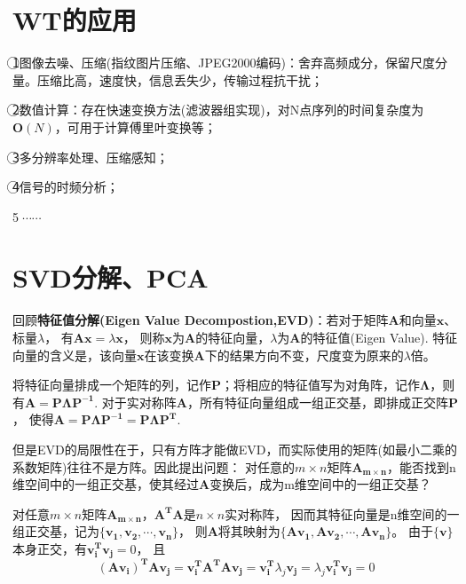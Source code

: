 \documentclass{article}
\begin{document}
\begin{CJK}{UTF8}{gbsn}
\section{WT的应用}
	\textcircled{1}图像去噪、压缩(指纹图片压缩、JPEG2000编码)：舍弃高频成分，保留尺度分量。压缩比高，速度快，信息丢失少，传输过程抗干扰；\par
	\textcircled{2}数值计算：存在快速变换方法(滤波器组实现)，对N点序列的时间复杂度为$\boldsymbol{O}(N)$，可用于计算傅里叶变换等；\par
	\textcircled{3}多分辨率处理、压缩感知；\par
	\textcircled{4}信号的时频分析；\par
	\textcircled{5}$\cdots\cdots$\\

\section{SVD分解、PCA}
	回顾\textbf{特征值分解(Eigen Value Decompostion,EVD)}：若对于矩阵$\boldsymbol{A}$和向量$\boldsymbol{x}$、标量$\lambda$，
	有$\boldsymbol{A}\boldsymbol{x}=\lambda\boldsymbol{x}$，
	则称$\boldsymbol{x}$为$\boldsymbol{A}$的特征向量，$\lambda$为$\boldsymbol{A}$的特征值(Eigen Value).
	特征向量的含义是，该向量$\boldsymbol{x}$在该变换$\boldsymbol{A}$下的结果方向不变，尺度变为原来的$\lambda$倍。\par
	将特征向量排成一个矩阵的列，记作$\boldsymbol{P}$；将相应的特征值写为对角阵，记作$\boldsymbol{\Lambda}$，则有$\boldsymbol{A}=\boldsymbol{P}\boldsymbol{\Lambda}\boldsymbol{P^{-1}}$.
	对于实对称阵$\boldsymbol{A}$，所有特征向量组成一组正交基，即排成正交阵$\boldsymbol{P}$，
	使得$\boldsymbol{A}=\boldsymbol{P}\boldsymbol{\Lambda}\boldsymbol{P^{-1}}=\boldsymbol{P}\boldsymbol{\Lambda}\boldsymbol{P^{T}}$.\par
	但是EVD的局限性在于，只有方阵才能做EVD，而实际使用的矩阵(如最小二乘的系数矩阵)往往不是方阵。因此提出问题：
	对任意的$m\times n$矩阵$\boldsymbol{A_{m\times n}}$，能否找到n维空间中的一组正交基，使其经过$\boldsymbol{A}$变换后，成为m维空间中的一组正交基？\par
	对任意$m\times n$矩阵$\boldsymbol{A_{m\times n}}$，$\boldsymbol{A^T}\boldsymbol{A}$是$n\times n$实对称阵，
	因而其特征向量是n维空间的一组正交基，记为$\{\boldsymbol{v_1},\boldsymbol{v_2},\cdots,\boldsymbol{v_n}\}$，
	则$\boldsymbol{A}$将其映射为$\{\boldsymbol{Av_1},\boldsymbol{Av_2},\cdots,\boldsymbol{Av_n}\}$。	
	由于$\{\boldsymbol{v}\}$本身正交，有$\boldsymbol{v^T_iv_j}=0$，
	且$$\boldsymbol{(Av_i)^TAv_j}=\boldsymbol{v^T_iA^TAv_j}=\boldsymbol{v^T_i}\lambda_j\boldsymbol{v_j}=\lambda_j\boldsymbol{v^T_iv_j}=0$$

\end{CJK}
\end{document}
